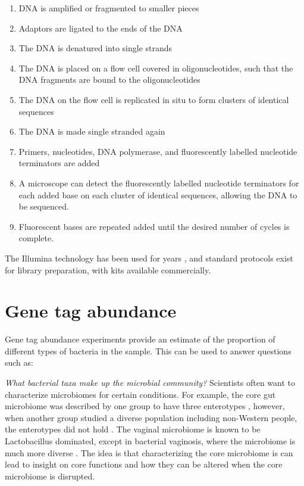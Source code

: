 \begin{enumerate}
\item DNA is amplified or fragmented to smaller pieces
\item Adaptors are ligated to the ends of the DNA
\item The DNA is denatured into single strands
\item The DNA is placed on a flow cell covered in oligonucleotides, such that the DNA fragments are bound to the oligonucleotides
\item The DNA on the flow cell is replicated in situ to form clusters of identical sequences
\item The DNA is made single stranded again
\item Primers, nucleotides, DNA polymerase, and fluorescently labelled nucleotide terminators are added
\item A microscope can detect the fluorescently labelled nucleotide terminators for each added base on each cluster of identical sequences, allowing the DNA to be sequenced.
\item Fluorescent bases are repeated added until the desired number of cycles is complete.
\end{enumerate}

The Illumina technology has been used for years \cite{bentley2008accurate}, and standard protocols exist for library preparation, with kits available commercially.

\section{Gene tag abundance}
Gene tag abundance experiments provide an estimate of the proportion of different types of bacteria in the sample. This can be used to answer questions such as:

\textit{What bacterial taxa make up the microbial community?}
Scientists often want to characterize microbiomes for certain conditions. For example, the core gut microbiome was described by one group to have three enterotypes \cite{arumugam2011enterotypes}, however, when another group studied a diverse population including non-Western people, the enterotypes did not hold \cite{yatsunenko2012human}. The vaginal microbiome is known to be Lactobacillus dominated, except in bacterial vaginosis, where the microbiome is much more diverse \cite{hummelen2010deep}. The idea is that characterizing the core microbiome is can lead to insight on core functions and how they can be altered when the core microbiome is disrupted.

